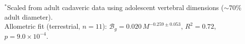 \begin{table}[h!]
\vspace{0.3em}
{\footnotesize $^*$Scaled from adult cadaveric data using adolescent vertebral dimensions ($\sim$70\% adult diameter).\\
Allometric fit (terrestrial, $n=11$): $\mathcal{B}_g = 0.020\,M^{-0.259\pm0.053}$, $R^2 = 0.72$, $p = 9.0 \times 10^{-4}$.}
\end{table}

